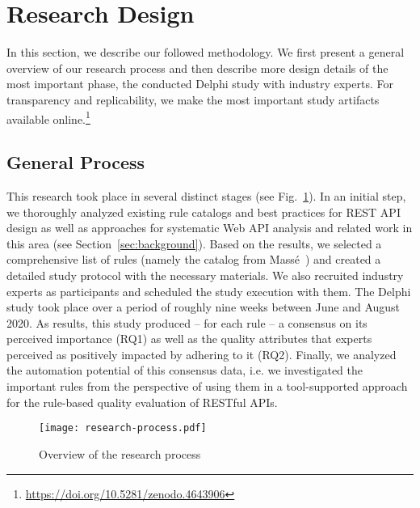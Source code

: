 \documentclass[runningheads]{llncs}
\begin{document}
\section{Research Design}
\label{sec:study-design}
In this section, we describe our followed methodology.
We first present a general overview of our research process and then describe more design details of the most important phase, the conducted Delphi study with industry experts.
For transparency and replicability, we make the most important study artifacts available online.\footnote{\url{https://doi.org/10.5281/zenodo.4643906}}

\subsection{General Process}
This research took place in several distinct stages (see Fig.~\ref{fig:research-process}).
In an initial step, we thoroughly analyzed existing rule catalogs and best practices for REST API design as well as approaches for systematic Web API analysis and related work in this area (see Section~\ref{sec:background}).
Based on the results, we selected a comprehensive list of rules (namely the catalog from Massé~\cite{book:RestApiDesignRulebook2011}) and created a detailed study protocol with the necessary materials.
We also recruited industry experts as participants and scheduled the study execution with them.
The Delphi study took place over a period of roughly nine weeks between June and August 2020.
As results, this study produced -- for each rule -- a consensus on its perceived importance (RQ1) as well as the quality attributes that experts perceived as positively impacted by adhering to it (RQ2).
Finally, we analyzed the automation potential of this consensus data, i.e. we investigated the important rules from the perspective of using them in a tool-supported approach for the rule-based quality evaluation of RESTful APIs.

\begin{figure}
    \centering
    \texttt{[image: research-process.pdf]}
    \caption{Overview of the research process}
    \label{fig:research-process}
\end{figure}
\end{document}
